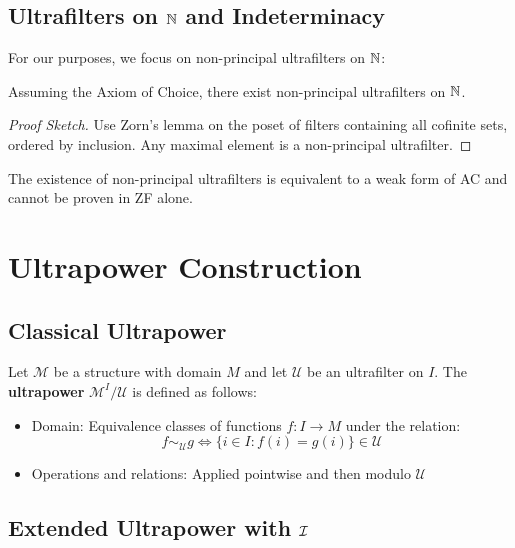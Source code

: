 \subsection{Ultrafilters on $\mathbb{N}$ and Indeterminacy}

For our purposes, we focus on non-principal ultrafilters on $\mathbb{N}$:

\begin{proposition}
\label{prop:nonprincipal-exist}
Assuming the Axiom of Choice, there exist non-principal ultrafilters on $\mathbb{N}$.
\end{proposition}

\begin{proof}[Proof Sketch]
Use Zorn's lemma on the poset of filters containing all cofinite sets, ordered by inclusion. Any maximal element is a non-principal ultrafilter.
\end{proof}

\begin{remark}
The existence of non-principal ultrafilters is equivalent to a weak form of AC and cannot be proven in ZF alone.
\end{remark}

\section{Ultrapower Construction}

\subsection{Classical Ultrapower}

\begin{definition}[Ultrapower]
Let $\mathcal{M}$ be a structure with domain $M$ and let $\mathcal{U}$ be an ultrafilter on $I$. The \textbf{ultrapower} $\mathcal{M}^I/\mathcal{U}$ is defined as follows:
\begin{itemize}
    \item Domain: Equivalence classes of functions $f : I \to M$ under the relation:
    \[
    f \sim_{\mathcal{U}} g \iff \{i \in I : f(i) = g(i)\} \in \mathcal{U}
    \]
    \item Operations and relations: Applied pointwise and then modulo $\mathcal{U}$
\end{itemize}
\end{definition}

\subsection{Extended Ultrapower with $\mathcal{I}$}

